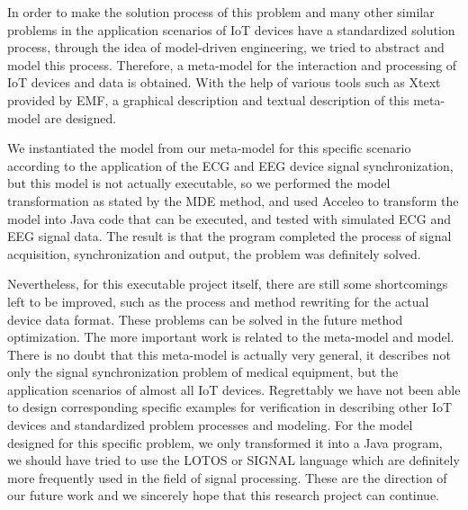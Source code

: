 \documentclass{article}
\begin{document}
In order to make the solution process of this problem and many other similar problems in the application scenarios of IoT devices have a standardized solution process, through the idea of model-driven engineering, we tried to abstract and model this process. Therefore, a meta-model for the interaction and processing of IoT devices and data is obtained. With the help of various tools such as Xtext provided by EMF, a graphical description and textual description of this meta-model are designed.

We instantiated the model from our meta-model for this specific scenario according to the application of the ECG and EEG device signal synchronization, but this model is not actually executable, so we performed the model transformation as stated by the MDE method, and used Acceleo to transform the model into Java code that can be executed, and tested with simulated ECG and EEG signal data. The result is that the program completed the process of signal acquisition, synchronization and output, the problem was definitely solved.

Nevertheless, for this executable project itself, there are still some shortcomings left to be improved, such as the process and method rewriting for the actual device data format. These problems can be solved in the future method optimization. The more important work is related to the meta-model and model. There is no doubt that this meta-model is actually very general, it describes not only the signal synchronization problem of medical equipment, but the application scenarios of almost all IoT devices. Regrettably we have not been able to design corresponding specific examples for verification in describing other IoT devices and standardized problem processes and modeling. For the model designed for this specific problem, we only transformed it into a Java program, we should have tried to use the LOTOS or SIGNAL language which are definitely more frequently used in the field of signal processing. These are the direction of our future work and we sincerely hope that this research project can continue.
\end{document}
